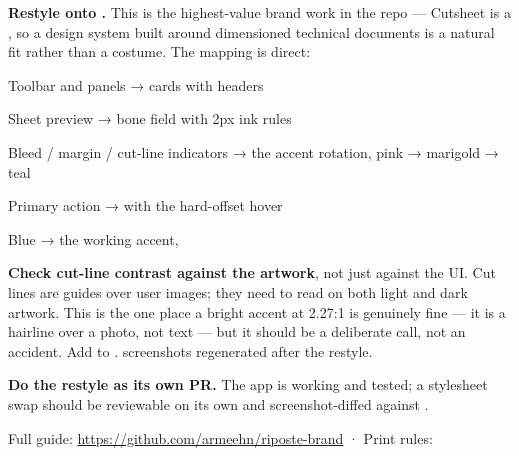 \documentclass[fontpath=fonts/,logopath=logo/]{riposte-doc}
\begin{document}
\begin{riptodolist}
\riptodo \textbf{Restyle  onto .} This is the highest-value brand work in the repo — Cutsheet is a , so a design system built around dimensioned technical documents is a natural fit rather than a costume. The mapping is direct:
\begin{ripbullets}
\item Toolbar and panels →  cards with  headers
\item Sheet preview → bone field with 2px ink rules
\item Bleed / margin / cut-line indicators → the accent rotation, pink → marigold → teal
\item Primary action →  with the hard-offset hover
\item Blue  → the working accent, 
\end{ripbullets}

\riptodo \textbf{Check cut-line contrast against the artwork}, not just against the UI. Cut lines are guides over user images; they need to read on both light and dark artwork. This is the one place a bright accent at 2.27:1 is genuinely fine — it is a hairline over a photo, not text — but it should be a deliberate call, not an accident.
\riptodo Add  to .
\riptodo {} screenshots regenerated after the restyle.
\end{riptodolist}

\textbf{Do the restyle as its own PR.} The app is working and tested; a stylesheet swap should be reviewable on its own and screenshot-diffed against .



\ripcodeopen
{}
\ripcodesizereset\ripcodeclose

Full guide: \url{https://github.com/armeehn/riposte-brand} · Print rules: \href{https://github.com/armeehn/riposte-brand/blob/main/docs/08-print.md}{}

\ripend
\end{document}
